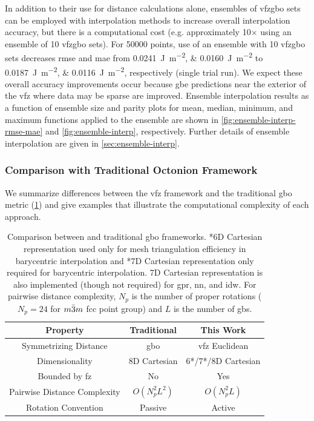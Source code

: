 \documentclass[final,twocolumn,12pt]{elsarticle}
\begin{document}
In addition to their use for distance calculations alone, ensembles of \gls{vfzgbo} sets can be employed with interpolation methods to increase overall interpolation accuracy, but there is a computational cost (e.g. approximately 10$\times$ using an ensemble of 10 \gls{vfzgbo} sets). For \num{50000} \inpt{} points, use of an ensemble with 10 \gls{vfzgbo} sets decreases \gls{rmse} and \gls{mae} from \SIlist{0.0241;0.0160}{\J\per\square\m} to \SIlist{0.0187;0.0116}{\J\per\square\m}, respectively (single trial run). We expect these overall accuracy improvements occur because \gls{gbe} predictions near the exterior of the \gls{vfz} where data may be sparse are improved. Ensemble interpolation results as a function of ensemble size and parity plots for mean, median, minimum, and maximum functions applied to the ensemble are shown in \cref{fig:ensemble-interp-rmse-mae} and \cref{fig:ensemble-interp}, respectively. Further details of ensemble interpolation are given in \cref{sec:ensemble-interp}.

\subsubsection{Comparison with Traditional Octonion Framework}

We summarize differences between the \gls{vfz} framework and the traditional \gls{gbo} metric (\cref{tab:closed-mesh-comparison}) and give examples that illustrate the computational complexity of each approach.

\begin{table}
\caption{Comparison between  and traditional \gls{gbo} frameworks. *6D Cartesian representation used only for mesh triangulation efficiency in barycentric interpolation and *7D Cartesian representation only required for barycentric interpolation. 7D Cartesian representation is also implemented (though not required) for \gls{gpr}, \gls{nn}, and \gls{idw}. For pairwise distance complexity, $N_p$ is the number of proper rotations ($N_p=24$ for $m\Bar{3}m$ \gls{fcc} point group) and $L$ is the number of \glspl{gb}.}
\centering
\begin{tabular}{ccc}
\toprule
Property & Traditional & This Work \\
\midrule
Symmetrizing Distance & \gls{gbo} & \gls{vfz} Euclidean \\
Dimensionality & 8D Cartesian & 6*/7*/8D Cartesian \\
Bounded by \gls{fz} & No & Yes \\
Pairwise Distance Complexity & $O(N_p^2L^2)$ & $O(N_p^2L)$ \\
Rotation Convention & Passive & Active \\
\bottomrule
\end{tabular}
\label{tab:closed-mesh-comparison}
\end{table}
\end{document}
